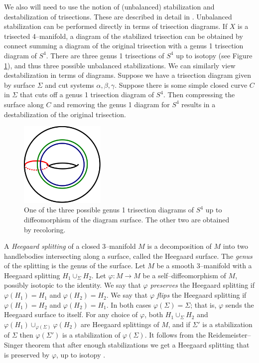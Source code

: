 \documentclass[12pt]{amsart}
\theoremstyle{definition}
\theoremstyle{remark}
\begin{document}
We also will need to use the notion of (unbalanced) stabilization and destabilization of trisections.  These are described in detail in \cite{MeierSchirmerZupan1}.  Unbalanced stabilization can be performed directly in terms of trisection diagrams.  If $X$ is a trisected 4--manifold, a diagram of the stabilized trisection can be obtained by connect summing a diagram of the original trisection with a genus 1 trisection diagram of $S^4$.  There are three genus 1 trisections of $S^4$ up to isotopy (see Figure \ref{s3g1}), and thus three possible unbalanced stabilizations.  We can similarly view destabilization in terms of diagrams.  Suppose we have a trisection diagram given by surface $\Sigma$ and cut systems $\alpha,\beta,\gamma$.  Suppose there is some simple closed curve $C$ in $\Sigma$ that cuts off a genus 1 trisection diagram of $S^4$.  Then compressing the surface along $C$ and removing the genus 1 diagram for $S^4$ results in a destabilization of the original trisection. 

\begin{figure}[h]
\centering
\includegraphics[height=1.6in]{S4trisection_genus1.png}
\caption{One of the three possible genus 1 trisection diagrams of $S^4$ up to diffeomorphism of the diagram surface.  The other two are obtained by recoloring.}
\label{s3g1}
\end{figure}

A \emph{Heegaard splitting} of a closed 3--manifold $M$ is a decomposition of $M$ into two handlebodies intersecting along a surface, called the Heegaard surface.  The \emph{genus} of the splitting is the genus of the surface.  Let $M$ be a smooth 3--manifold with a Heegaard splitting $H_1 \cup_\Sigma H_2$.  Let $\varphi \colon M \to M$ be a self--diffeomorphism of $M$, possibly isotopic to the identity.  We say that $\varphi$ \emph{preserves} the Heegaard splitting if $\varphi(H_1) = H_1$ and $\varphi(H_2)=H_2$.  We say that $\varphi$ \emph{flips} the Heegaard splitting if $\varphi(H_1) = H_2$ and $\varphi(H_2)=H_1$.  In both cases $\varphi(\Sigma) = \Sigma$; that is, $\varphi$ sends the Heegaard surface to itself.  For any choice of $\varphi$, both $H_1 \cup_\Sigma H_2$ and $\varphi(H_1) \cup_{\varphi(\Sigma)} \varphi(H_2)$ are Heegaard splittings of $M$, and if $\Sigma'$ is a stabilization of $\Sigma$ then $\varphi(\Sigma')$ is a stabilization of $\varphi(\Sigma)$.  It follows from the Reidemeister--Singer theorem that after enough stabilizations we get a Heegaard splitting that is preserved by $\varphi$, up to isotopy \cite{Reidemeister1}\cite{Singer1}.  
\end{document}
